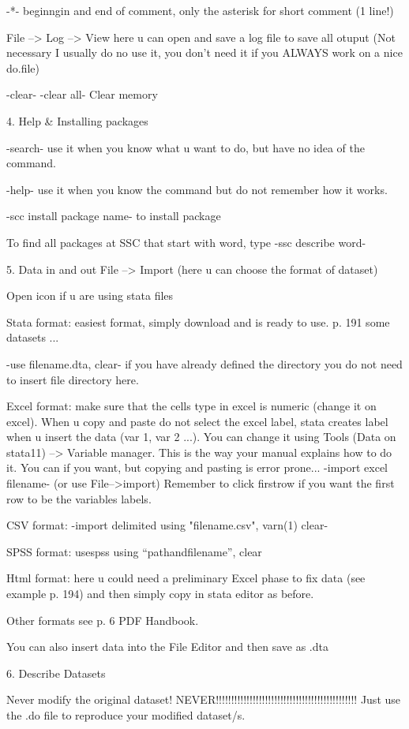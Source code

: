 \documentclass[11pt]{article}
\theoremstyle{definition}
\begin{document}
-*- beginngin and end of comment, only the asterisk for short comment (1 line!)

File --> Log --> View here u can open and save a log file to save all otuput (Not necessary I usually do no use it, you don't need it if you ALWAYS work on a nice do.file)

-clear-     -clear all-
Clear memory


	4. Help & Installing packages

-search-
use it when you know what u want to do, but have no idea of the command.

-help-
use it when you know the command but do not remember how it works.

-scc install package name-
to install package

To find all packages at SSC that start with word, type -ssc describe word-


	5. Data in and out
File --> Import (here u can choose the format of dataset)

Open icon if u are using stata files

Stata format: easiest format, simply download and is ready to use. p. 191 some datasets ...

-use filename.dta, clear-
if you have already defined the directory you do not need to insert file directory here.

Excel format: make sure that the cells type in excel is numeric (change it on excel). When u copy and paste do not select the excel label, stata creates label when u insert the data (var 1, var 2 ...). You can change it using Tools (Data on stata11) --> Variable manager. This is the way your manual explains how to do it. You can if you want, but copying and pasting is error prone...
-import excel filename- (or use File-->import)
Remember to click firstrow if you want the first row to be the variables labels.

CSV format:
-import delimited using "filename.csv", varn(1) clear-

SPSS format:
usespss using “pathandfilename”, clear

Html format: here u could need a preliminary Excel phase to fix data (see example p. 194) and then simply copy in stata editor as before.

Other formats see p. 6 PDF Handbook.

You can also insert data into the File Editor and then save as .dta

6. Describe Datasets

Never modify the original dataset! NEVER!!!!!!!!!!!!!!!!!!!!!!!!!!!!!!!!!!!!!!!!!!!!!!
Just use the .do file to reproduce your modified dataset/s.
\end{document}
